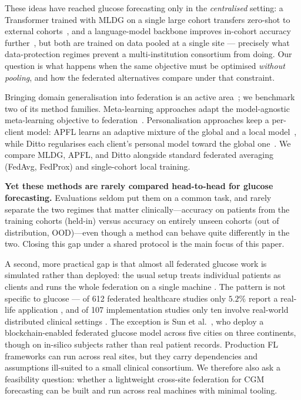 \documentclass[10pt,letterpaper]{article}
\begin{document}
These ideas have reached glucose forecasting only in the \emph{centralised}
setting: a Transformer trained with MLDG on a single large cohort transfers
zero-shot to external cohorts~\cite{zhu2024gpformer}, and a language-model
backbone improves in-cohort accuracy further~\cite{zhu2026glullm}, but both
are trained on data pooled at a single site --- precisely what
data-protection regimes prevent a multi-institution consortium from doing.
Our question is what happens when the same objective must be optimised
\emph{without pooling}, and how the federated alternatives compare under
that constraint.

Bringing domain generalisation into federation is an active
area~\cite{li2025fedDGsurvey}; we benchmark two of its method families.
Meta-learning approaches adapt the model-agnostic meta-learning objective
to federation~\cite{chen2018fedmeta,fallah2020perfedavg}. Personalisation
approaches keep a per-client model: APFL learns an adaptive mixture of the
global and a local model~\cite{deng2020apfl}, while Ditto regularises each
client's personal model toward the global one~\cite{li2021ditto}. We
compare MLDG, APFL, and Ditto alongside standard federated averaging
(FedAvg, FedProx) and single-cohort local training.

\textbf{Yet these methods are rarely compared head-to-head for glucose
forecasting.} Evaluations seldom put them on a common task, and rarely
separate the two regimes that matter clinically---accuracy on patients from
the training cohorts (held-in) versus accuracy on entirely unseen cohorts
(out of distribution, OOD)---even though a method can behave quite
differently in the two. Closing this gap under a shared protocol is the
main focus of this paper.

A second, more practical gap is that almost all federated glucose work is
simulated rather than deployed: the usual setup treats individual patients
as clients and runs the whole federation on a single machine
\cite{piao2023graph,piao2026gluadfl,darpit2025fedglu,defalco2023federated}.
The pattern is not specific to glucose --- of 612 federated healthcare
studies only $5.2\%$ report a real-life application \cite{teo2024federated},
and of 107 implementation studies only ten involve real-world distributed
clinical settings \cite{li2025challenges}. The exception is Sun et al.\
\cite{sun2025multicontinental}, who deploy a blockchain-enabled federated
glucose model across five cities on three continents, though on in-silico
subjects rather than real patient records. Production FL frameworks can run
across real sites, but they carry dependencies and assumptions ill-suited
to a small clinical consortium. We therefore also ask a feasibility
question: whether a lightweight cross-site federation for CGM forecasting
can be built and run across real machines with minimal tooling.
\end{document}
